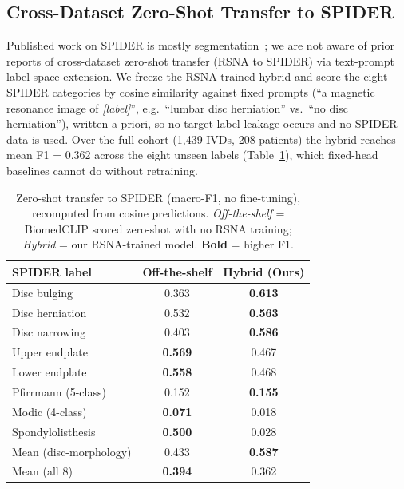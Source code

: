 \documentclass[runningheads]{llncs}
\newcommand{\best}[1]{\textcolor{best}{\textbf{#1}}}
\begin{document}
\subsection{Cross-Dataset Zero-Shot Transfer to SPIDER}

Published work on SPIDER is mostly segmentation~\cite{vandergraaf2024spider}; we are not aware of prior reports of cross-dataset zero-shot transfer (RSNA to SPIDER) via text-prompt label-space extension. We freeze the RSNA-trained hybrid and score the eight SPIDER categories by cosine similarity against fixed prompts (``a magnetic resonance image of \emph{[label]}'', e.g.\ ``lumbar disc herniation'' vs.\ ``no disc herniation''), written a priori, so no target-label leakage occurs and no SPIDER data is used. Over the full cohort (1{,}439 IVDs, 208 patients) the hybrid reaches mean F1 = 0.362 across the eight unseen labels (Table~\ref{tab:spider}), which fixed-head baselines cannot do without retraining.

\begin{table}[ht]
\centering
\caption{Zero-shot transfer to SPIDER (macro-F1, no fine-tuning), recomputed from cosine predictions. \emph{Off-the-shelf} = BiomedCLIP scored zero-shot with no RSNA training; \emph{Hybrid} = our RSNA-trained model. \textbf{Bold} = higher F1.}
\label{tab:spider}
\begin{tabular}{@{}lcc@{}}
\toprule
SPIDER label              & Off-the-shelf & Hybrid (Ours) \\
\midrule
Disc bulging              & 0.363 & \best{0.613} \\
Disc herniation           & 0.532 & \best{0.563} \\
Disc narrowing            & 0.403 & \best{0.586} \\
\midrule
Upper endplate            & \best{0.569} & 0.467 \\
Lower endplate            & \best{0.558} & 0.468 \\
Pfirrmann (5-class)       & 0.152 & \best{0.155} \\
Modic (4-class)           & \best{0.071} & 0.018 \\
Spondylolisthesis         & \best{0.500} & 0.028 \\
\midrule
Mean (disc-morphology)    & 0.433 & \best{0.587} \\
Mean (all 8)              & \best{0.394} & 0.362 \\
\bottomrule
\end{tabular}
\end{table}
\end{document}
